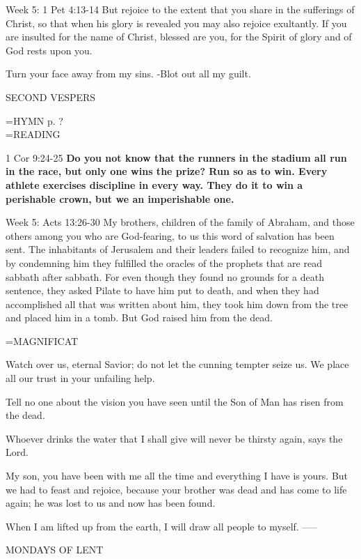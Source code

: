 Week 5:  1 Pet 4:13-14  But rejoice to the extent that you share in the sufferings of Christ, so that when his glory is revealed you may also rejoice exultantly. If you are insulted for the name of Christ, blessed are you, for the Spirit of glory and of God rests upon you.

Turn your face away from my sins.
-Blot out all my guilt.

\begin{flushleft}\normalsize SECOND VESPERS\\\end{flushleft}
\hangindent=\parindent \small{\uppercase{HYMN} p.  ?\\}
\hangindent=\parindent \small READING
\begin{description}[labelindent=\parindent, leftmargin=*]
\item [Week 1-4:]   1 Cor 9:24-25 \textbf{  Do you not know that the runners in the stadium all run in the race, but only one wins the prize? Run so as to win. Every athlete exercises discipline in every way. They do it to win a perishable crown, but we an imperishable one.}
\end{description}

Week 5:  Acts 13:26-30   My brothers, children of the family of Abraham, and those others among you who are God-fearing, to us this word of salvation has been sent. The inhabitants of Jerusalem and their leaders failed to recognize him, and by condemning him they fulfilled the oracles of the prophets that are read sabbath after sabbath. For even though they found no grounds for a death sentence, they asked Pilate to have him put to death, and when they had accomplished all that was written about him, they took him down from the tree and placed him in a tomb. But God raised him from the dead.

\hangindent=\parindent \small MAGNIFICAT
\begin{description}[labelindent=\parindent, noitemsep, leftmargin=*]
\item [Week 1:] 	Watch over us, eternal Savior; do not let the cunning tempter seize us. We place all our trust in your unfailing help.
\item [Week 2:] 	Tell no one about the vision you have seen until the Son of Man has risen from the dead.
\item [Week 3:] 	Whoever drinks the water that I shall give will never be thirsty again, says the Lord.
\item [Week 4:] 	My son, you have been with me all the time and everything I have is yours. But we had to feast and rejoice, because your brother was dead and has come to life again; he was lost to us and now has been found.
\item [Week 5:] 	When I am lifted up from the earth, I will draw all people to myself.
-----
\begin{center}
\normalsize MONDAYS OF LENT
\end{center}
\end{description}

